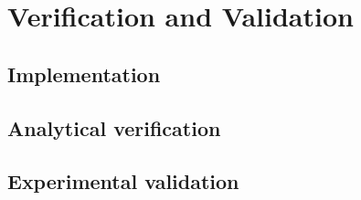 \chapter{Verification and Validation}

\section{Implementation}

\section{Analytical verification}


\section{Experimental validation}
